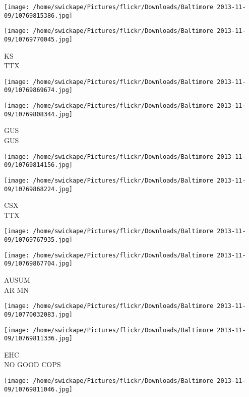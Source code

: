 \documentclass[10pt,letterpaper]{article}
\begin{document}
\texttt{[image: /home/swickape/Pictures/flickr/Downloads/Baltimore 2013-11-09/10769815386.jpg]}

\vspace{0.25in}
\texttt{[image: /home/swickape/Pictures/flickr/Downloads/Baltimore 2013-11-09/10769770045.jpg]}

KS\\
TTX\\
\pagebreak

\texttt{[image: /home/swickape/Pictures/flickr/Downloads/Baltimore 2013-11-09/10769869674.jpg]}

\vspace{0.25in}
\texttt{[image: /home/swickape/Pictures/flickr/Downloads/Baltimore 2013-11-09/10769808344.jpg]}

GUS\\
GUS\\
\pagebreak

\texttt{[image: /home/swickape/Pictures/flickr/Downloads/Baltimore 2013-11-09/10769814156.jpg]}

\vspace{0.25in}
\texttt{[image: /home/swickape/Pictures/flickr/Downloads/Baltimore 2013-11-09/10769868224.jpg]}

CSX\\
TTX\\
\pagebreak

\texttt{[image: /home/swickape/Pictures/flickr/Downloads/Baltimore 2013-11-09/10769767935.jpg]}

\vspace{0.25in}
\texttt{[image: /home/swickape/Pictures/flickr/Downloads/Baltimore 2013-11-09/10769867704.jpg]}

AUSUM\\
AR MN\\
\pagebreak

\texttt{[image: /home/swickape/Pictures/flickr/Downloads/Baltimore 2013-11-09/10770032083.jpg]}

\vspace{0.25in}
\texttt{[image: /home/swickape/Pictures/flickr/Downloads/Baltimore 2013-11-09/10769811336.jpg]}

EHC\\
NO GOOD COPS\\
\pagebreak

\texttt{[image: /home/swickape/Pictures/flickr/Downloads/Baltimore 2013-11-09/10769811046.jpg]}
\end{document}
